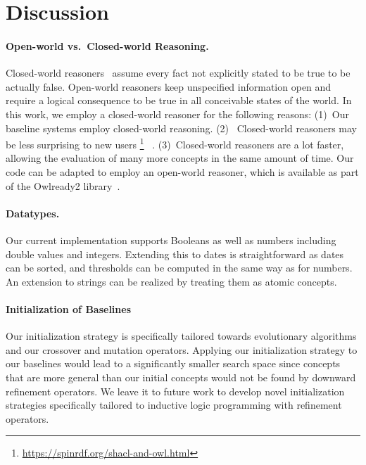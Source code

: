 \section{Discussion}%
\label{sec:discussion}

\paragraph{Open-world vs.\ Closed-world Reasoning.} Closed-world reasoners~\citep{Kroetzsch2012Description} assume every fact not explicitly stated to be true to be actually false. Open-world reasoners keep unspecified information open and require a logical consequence to be true in all conceivable states of the world. In this work, we employ a closed-world reasoner for the following reasons: (1)~Our baseline systems employ closed-world reasoning. (2)~
Closed-world reasoners may be less surprising to new users%
\footnote{\url{https://spinrdf.org/shacl-and-owl.html}}
~\cite{Ruttenberg2005Experience}.
(3)~Closed-world reasoners are a lot faster, allowing the evaluation of many more concepts in the same amount of time. Our code can be adapted to employ an open-world reasoner, which is available as part of the Owlready2 library~\cite{Lamy2017OWL}.

\paragraph{Datatypes.}
Our current implementation supports Booleans as well as numbers including double values and integers. Extending this to dates is straightforward as dates can be sorted, and thresholds can be computed in the same way as for numbers. An extension to strings can be realized by treating them as atomic concepts.

\paragraph{Initialization of Baselines}
Our initialization strategy is specifically tailored towards evolutionary algorithms and our crossover and mutation operators. Applying our initialization strategy to our baselines would lead to a significantly smaller search space since concepts that are more general than our initial concepts would not be found by downward refinement operators. We leave it to future work to develop novel initialization strategies specifically tailored to inductive logic programming with refinement operators.
